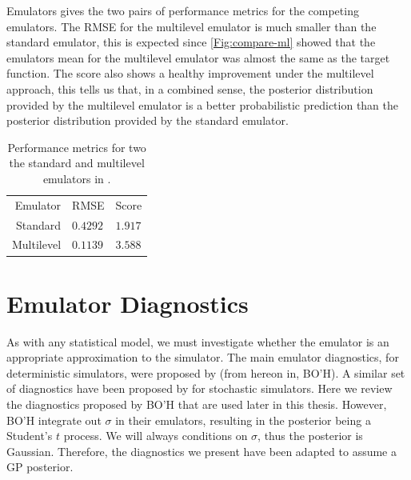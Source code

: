 \begin{chapter}{Emulators \label{Ch:Emulators}}
 gives the two pairs of performance metrics for the competing emulators. The RMSE for the multilevel emulator is much smaller than the standard emulator, this is expected since \cref{Fig:compare-ml} showed that the emulators mean for the multilevel emulator was almost the same as the target function. The score also shows a healthy improvement under the multilevel approach, this tells us that, in a combined sense, the posterior distribution provided by the multilevel emulator is a better probabilistic prediction than the posterior distribution provided by the standard emulator.
\begin{table}
\centering
  \begin{tabular}{rll}
    \toprule
    Emulator & RMSE & Score \\ \cmidrule{1-3}
    Standard&$0.4292$&$1.917$\\
    Multilevel&$0.1139$&$3.588$\\
    \bottomrule
  \end{tabular}
  \caption{Performance metrics for two the standard and multilevel emulators in .}
  \label{Tab:toy-ml-metric}
\end{table}
\section{Emulator Diagnostics}
As with any statistical model, we must investigate whether the emulator is an appropriate approximation to the simulator. The main emulator diagnostics, for deterministic simulators, were proposed by \citet{Bastos09} (from hereon in, BO'H). A similar set of diagnostics have been proposed by \citet{Baker2019a} for stochastic simulators.
Here we review the diagnostics proposed by BO'H that are used later in this thesis. However, BO'H integrate out $\sigma$ in their emulators, resulting in the posterior being a Student's $t$ process. We will always conditions on $\sigma$, thus the posterior is Gaussian. Therefore, the diagnostics we present have been adapted to assume a GP posterior.

\end{chapter}
